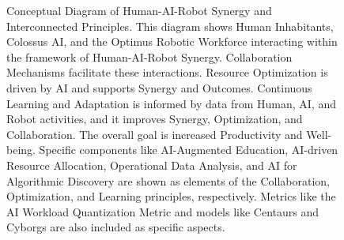 \documentclass[fontsize=10pt, oneside, DIV=calc]{scrartcl}
\begin{document}
\medskip

\noindent


\begin{figure}[H]
  \centering
  \noindent
  \begin{minipage}{\textwidth}
    \centering
    \caption{Conceptual Diagram of Human-AI-Robot Synergy and Interconnected Principles. This diagram shows Human Inhabitants, Colossus AI, and the Optimus Robotic Workforce interacting within the framework of Human-AI-Robot Synergy. Collaboration Mechanisms facilitate these interactions. Resource Optimization is driven by AI and supports Synergy and Outcomes. Continuous Learning and Adaptation is informed by data from Human, AI, and Robot activities, and it improves Synergy, Optimization, and Collaboration. The overall goal is increased Productivity and Well-being. Specific components like AI-Augmented Education, AI-driven Resource Allocation, Operational Data Analysis, and AI for Algorithmic Discovery are shown as elements of the Collaboration, Optimization, and Learning principles, respectively. Metrics like the AI Workload Quantization Metric and models like Centaurs and Cyborgs are also included as specific aspects.}
  \end{minipage}
\end{figure}
\end{document}
